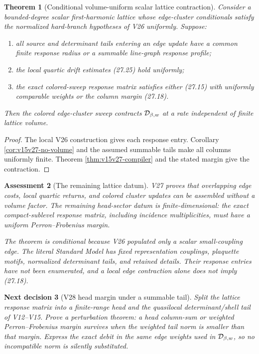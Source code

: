 \documentclass[11pt]{article}
\newtheorem{theorem}{Theorem}[section]
\newtheorem{decision}[theorem]{Next decision}
\newtheorem{assessment}[theorem]{Assessment}
\theoremstyle{remark}
\begin{document}
\begin{theorem}[Conditional volume-uniform scalar lattice
contraction]
\label{thm:v15v27-scalar-lattice}
Consider a bounded-degree scalar first-harmonic lattice whose
edge-cluster conditionals satisfy the normalized hard-branch
hypotheses of V26 uniformly.  Suppose:
\begin{enumerate}
\item all source and determinant tails entering an edge update have
      a common finite response radius or a summable line-graph
      response profile;
\item the local quartic drift estimates (27.25) hold uniformly;
\item the exact colored-sweep response matrix satisfies either
      (27.15) with uniformly comparable weights or the column
      margin (27.18).
\end{enumerate}
Then the colored edge-cluster sweep contracts
\({\cal D}_{\beta,w}\) at a rate independent of finite lattice
volume.
\end{theorem}

\begin{proof}
The local V26 construction gives each response entry.  Corollary
\ref{cor:v15v27-no-volume} and the assumed summable tails make all
columns uniformly finite.  Theorem \ref{thm:v15v27-compiler} and
the stated margin give the contraction.
\end{proof}

\begin{assessment}[The remaining lattice datum]
\label{ass:v15v27-reading}
V27 proves that overlapping edge costs, local quartic returns, and
colored cluster updates can be assembled without a volume factor.
The remaining head-sector datum is finite-dimensional: the exact
compact-sublevel response matrix, including incidence
multiplicities, must have a uniform Perron--Frobenius margin.

The theorem is conditional because V26 populated only a scalar
small-coupling edge.  The literal Standard Model has fixed
representation couplings, plaquette motifs, normalized determinant
tails, and retained details.  Their response entries have not been
enumerated, and a local edge contraction alone does not imply
(27.18).
\end{assessment}

\begin{decision}[V28 head margin under a summable tail]
\label{dec:v15v27-next}
Split the lattice response matrix into a finite-range head and the
quasilocal determinant/shell tail of V12--V15.  Prove a perturbation
theorem: a head column-sum or weighted Perron--Frobenius margin
survives when the weighted tail norm is smaller than that margin.
Express the exact debit in the same edge weights used in
\({\cal D}_{\beta,w}\), so no incompatible norm is silently
substituted.
\end{decision}
\end{document}

